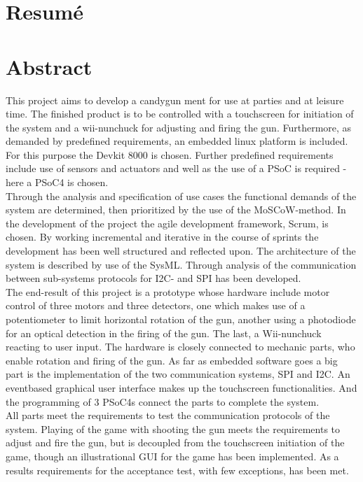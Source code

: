 \chapter{Resumé}
\chapter{Abstract}
This project aims to develop a candygun ment for use at parties and at leisure time. The finished product is to be controlled with a touchscreen for initiation of the system and a wii-nunchuck for adjusting and firing the gun. Furthermore, as demanded by predefined requirements,  an embedded linux platform is included. For this purpose the Devkit 8000 is chosen. Further predefined requirements include use of sensors and actuators and well as the use of a PSoC is required - here a PSoC4 is chosen. \\
Through the analysis and specification of use cases the functional demands of the system are determined, then prioritized by the use of the MoSCoW-method. In the development of the project the agile development framework, Scrum, is chosen. By working incremental and iterative in the course of sprints the development has been well structured and reflected upon. The architecture of the system is described by use of the SysML. Through analysis of the communication between sub-systems protocols for I2C- and SPI has been developed. \\ 
The end-result of this project is a prototype whose hardware include motor control of three motors and three detectors, one which makes use of a potentiometer to limit horizontal rotation of the gun, another using a photodiode for an optical detection in the firing of the gun. The last, a Wii-nunchuck reacting to user input. The hardware is closely connected to mechanic parts, who enable rotation and firing of the gun. As far as embedded software goes a big part is the implementation of the two communication systems, SPI and I2C. An eventbased graphical user interface makes up the touchscreen functionalities. And the programming of 3 PSoC4s connect the parts to complete the system. \\
All parts meet the requirements to test the communication protocols of the system. Playing of the game with shooting the gun meets the requirements to adjust and fire the gun, but is decoupled from the touchscreen initiation of the game, though an illustrational GUI for the game has been implemented. As a results requirements for the acceptance test, with few exceptions, has been met.
